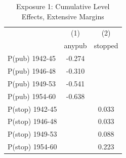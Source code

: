 \begin{table}[htbp]\centering
\def\sym#1{\ifmmode^{#1}\else\(^{#1}\)\fi}
\caption{Exposure 1: Cumulative Level Effects, Extensive Margins}
\begin{tabular}{l*{2}{c}}
\hline\hline
            &\multicolumn{1}{c}{(1)}&\multicolumn{1}{c}{(2)}\\
            &\multicolumn{1}{c}{anypub}&\multicolumn{1}{c}{stopped}\\
\hline
P(pub) 1942-45&      -0.274&            \\
P(pub) 1946-48&      -0.310&            \\
P(pub) 1949-53&      -0.541&            \\
P(pub) 1954-60&      -0.638&            \\
P(stop) 1942-45&            &       0.033\\
P(stop) 1946-48&            &       0.033\\
P(stop) 1949-53&            &       0.088\\
P(stop) 1954-60&            &       0.223\\
\hline\hline
\end{tabular}
\end{table}
